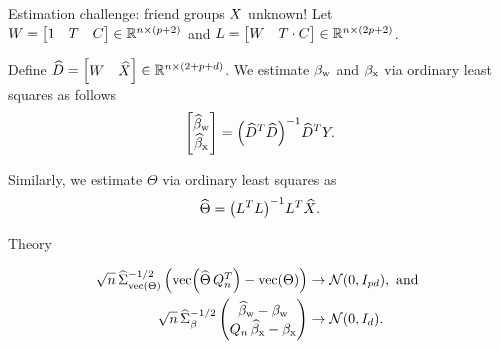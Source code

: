 \documentclass[final]{beamer}
\newlength{\colwidth}
\begin{document}
\begin{frame}[t]
\begin{columns}[t]
\begin{column}{\colwidth}
\begin{block}{Estimation challenge: friend groups $X$ unknown!}
    Let $W = \begin{bmatrix} 1 & T & C \end{bmatrix} \in \mathbb{R}^{n \times (p + 2)}$ and $L = \begin{bmatrix} W & T \cdot C \end{bmatrix} \in \mathbb{R}^{n \times (2 p + 2)}$.

    Define $\widehat{D} = \begin{bmatrix} W & \widehat{X} \end{bmatrix} \in \mathbb{R}^{n \times (2 + p + d)}$. We estimate $\beta_\text{w}$ and $\beta_\text{x}$ via ordinary least squares as follows
    \begin{equation*}
        \begin{bmatrix}
            \betawhat \\
            \betaxhat
        \end{bmatrix}
        = \paren*{\Dhat^T \Dhat}^{-1} \Dhat^T Y.
    \end{equation*}

    Similarly, we estimate $\Theta$ via ordinary least squares as
    \begin{equation*}
        \Thetahat
        = \paren*{\Wfull^T \Wfull}^{-1} \Wfull^T \Xhat.
    \end{equation*}
    
  \end{block}


  \begin{exampleblock}{Theory}

    
    \begin{equation*}
        \begin{aligned}
            \sqrt{ n } \,
            \Sigmahattheta^{-1/2}
            \begin{pmatrix}
                \vecc \paren*{\Thetahat \, Q_n^T} - \Thetavec
            \end{pmatrix}
              & \to
            \Normal{0}{I_{p d}}, \text{ and } \\
            \sqrt{ n } \,
            \Sigmahatbeta^{-1/2}
            \begin{pmatrix}
                \betawhat - \betaw \\
                Q_n \, \betaxhat - \betax
            \end{pmatrix}
              & \to
            \Normal{0}{I_d}.
        \end{aligned}
  \end{equation*}
      


\end{exampleblock}
\end{column}
\end{columns}
\end{frame}
\end{document}

